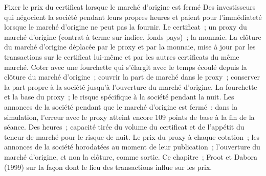 \begin{strategyfile}{Fixer le prix du certificat lorsque le marché d'origine est fermé}\label{strat:hf:depositary-receipts-and-dual-listings:closed}
 Des investisseurs qui négocient la société pendant leurs propres heures et paient pour l'immédiateté lorsque le marché d'origine ne peut pas la fournir.
 Le certificat~; un proxy du marché d'origine (contrat à terme sur indice, fonds pays)~; la monnaie.
 La clôture du marché d'origine déplacée par le proxy et par la monnaie, mise à jour par les transactions sur le certificat lui-même et par les autres certificats du même marché.
 Coter avec une fourchette qui s'élargit avec le temps écoulé depuis la clôture du marché d'origine~; couvrir la part de marché dans le proxy~; conserver la
part propre à la société jusqu'à l'ouverture du marché d'origine.
 La fourchette et la base du proxy~; le risque spécifique à la société pendant la nuit.
 Les annonces de la société pendant que le marché d'origine est fermé~: dans la simulation, l'erreur avec le proxy atteint encore 109 points de base à la
fin de la séance.
 Des heures~; capacité tirée du volume du certificat et de l'appétit du teneur de marché pour le risque de nuit.
 Le prix du proxy à chaque cotation~; les annonces de la société horodatées au moment de leur publication~; l'ouverture du marché d'origine, et non la clôture, comme sortie.
 Ce chapitre~; Froot et Dabora (1999) sur la façon dont le lieu des transactions influe sur les prix.
\end{strategyfile}

